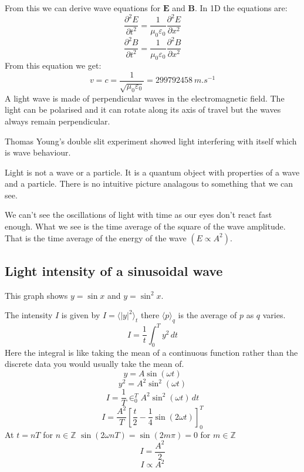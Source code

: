 \documentclass{article}
\renewcommand{\vec}[1]{\bm{#1}}
\newcommand{\vv}[1]{\vec{#1}}
\newcommand{\pd}[3][]{\frac{\partial^{#1}{#2}}{\partial{#3}^{#1}}}
\newcommand{\bb}[1]{\mathbb{#1}}
\begin{document}
From this we can derive wave equations for \(\vv E\) and \(\vv B\). In 1D the equations are:
\[\pd[2]{E}{t}=\frac{1}{\mu_0\varepsilon_0}\pd[2]{E}{x}\]
\[\pd[2]{B}{t}=\frac{1}{\mu_0\varepsilon_0}\pd[2]{B}{x}\]
From this equation we get:
\[v=c=\frac{1}{\sqrt{\mu_0\varepsilon_0}}=\SI{299792458}{m.s^{-1}}\]
A light wave is made of perpendicular waves in the electromagnetic field. The light can be polarised and it can rotate along its axis of travel but the waves always remain perpendicular.

Thomas Young's double slit experiment showed light interfering with itself which is wave behaviour.

Light is not a wave or a particle. It is a quantum object with properties of a wave and a particle. There is no intuitive picture analagous to something that we can see.

We can't see the oscillations of light with time as our eyes don't react fast enough. What we see is the time average of the square of the wave amplitude. That is the time average of the energy of the wave \((E\propto A^2)\).

\subsection*{Light intensity of a sinusoidal wave}


This graph shows \(y=\sin x\) and \(y=\sin^2x\).

The intensity \(I\) is given by \(I=\langle|y|^2\rangle_t\) there \(\langle p\rangle_q\) is the average of \(p\) as \(q\) varies.
\[I=\frac 1t\int_0^Ty^2\,dt\]
Here the integral is like taking the mean of a continuous function rather than the discrete data you would usually take the mean of.
\[y=A\sin(\omega t)\]
\[y^2=A^2\sin^2(\omega t)\]
\[I=\frac 1T\in_0^TA^2\sin^2(\omega t)\,dt\]
\[I=\frac{A^2}{T}\left[\frac t2-\frac 14\sin(2\omega t)\right]_0^T\]
At \(t=nT\) for \(n\in\bb Z\) \(\sin(2\omega nT)=\sin(2m\pi)=0\) for \(m\in\bb Z\)
\[I=\frac{A^2}{2}\]
\[I\propto A^2\]
\end{document}
